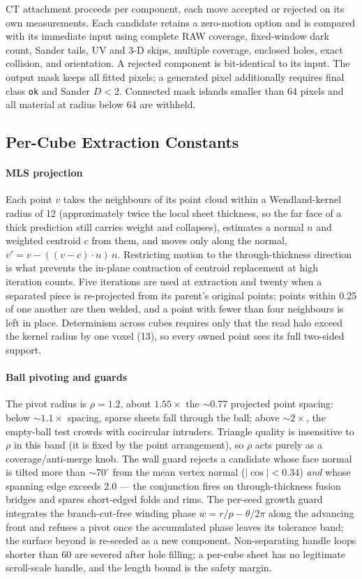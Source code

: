 CT attachment proceeds per component, each move accepted or rejected on its own measurements. Each candidate retains a zero-motion option and is compared with its immediate input using complete RAW coverage, fixed-window dark count, Sander tails, UV and 3-D skips, multiple coverage, enclosed holes, exact collision, and orientation. A rejected component is bit-identical to its input. The output mask keeps all fitted pixels; a generated pixel additionally requires final class \texttt{ok} and Sander $D<2$. Connected mask islands smaller than 64 pixels and all material at radius below 64 are withheld.

\subsection{Per-Cube Extraction Constants}
\label{app:extraction}

\paragraph{MLS projection} Each point $v$ takes the neighbours of its point cloud within a Wendland-kernel radius of 12 (approximately twice the local sheet thickness, so the far face of a thick prediction still carries weight and collapses), estimates a normal $n$ and weighted centroid $c$ from them, and moves only along the normal, $v' = v - ((v-c)\cdot n)\,n$. Restricting motion to the through-thickness direction is what prevents the in-plane contraction of centroid replacement at high iteration counts. Five iterations are used at extraction and twenty when a separated piece is re-projected from its parent's original points; points within 0.25 of one another are then welded, and a point with fewer than four neighbours is left in place. Determinism across cubes requires only that the read halo exceed the kernel radius by one voxel (13), so every owned point sees its full two-sided support.

\paragraph{Ball pivoting and guards} The pivot radius is $\rho = 1.2$, about $1.55\times$ the $\sim$0.77 projected point spacing: below ${\sim}1.1\times$ spacing, sparse sheets fall through the ball; above ${\sim}2\times$, the empty-ball test crowds with cocircular intruders. Triangle quality is insensitive to $\rho$ in this band (it is fixed by the point arrangement), so $\rho$ acts purely as a coverage/anti-merge knob. The wall guard rejects a candidate whose face normal is tilted more than ${\sim}70^\circ$ from the mean vertex normal ($|\cos| < 0.34$) {\em and} whose spanning edge exceeds 2.0 --- the conjunction fires on through-thickness fusion bridges and spares short-edged folds and rims. The per-seed growth guard integrates the branch-cut-free winding phase $w = r/p - \theta/2\pi$ along the advancing front and refuses a pivot once the accumulated phase leaves its tolerance band; the surface beyond is re-seeded as a new component. Non-separating handle loops shorter than 60 are severed after hole filling; a per-cube sheet has no legitimate scroll-scale handle, and the length bound is the safety margin.

